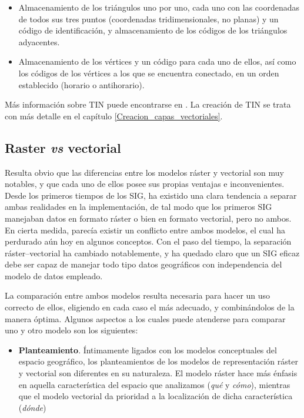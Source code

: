 \begin{multicols}{2}
\begin{itemize}
 \item Almacenamiento de los triángulos uno por uno, cada uno con las coordenadas de todos sus tres puntos (coordenadas tridimensionales, no planas) y un código de identificación, y almacenamiento de los códigos de los triángulos adyacentes.
\item Almacenamiento de los vértices y un código para cada uno de ellos, así como los códigos de los vértices a los que se encuentra conectado, en un orden establecido (horario o antihorario).
\end{itemize}

Más información sobre TIN puede encontrarse en \cite{Mark1975GA}. La creación de TIN se trata con más detalle en el capítulo \ref{Creacion_capas_vectoriales}.

\subsection{Raster \emph{vs} vectorial}

Resulta obvio que las diferencias entre los modelos ráster y vectorial son muy notables, y que cada uno de ellos posee sus propias ventajas e inconvenientes. Desde los primeros tiempos de los SIG, ha existido una clara tendencia a separar ambas realidades en la implementación, de tal modo que los primeros SIG manejaban datos en formato ráster o bien en formato vectorial, pero no ambos. En cierta medida, parecía existir un conflicto entre ambos modelos, el cual ha perdurado aún hoy en algunos conceptos. Con el paso del tiempo, la separación ráster--vectorial ha cambiado notablemente, y ha quedado claro que un SIG eficaz debe ser capaz de manejar todo tipo datos geográficos con independencia del modelo de datos empleado. 

La comparación entre ambos modelos resulta necesaria para hacer un uso correcto de ellos, eligiendo en cada caso el más adecuado, y combinándolos de la manera óptima. Algunos aspectos a los cuales puede atenderse para comparar uno y otro modelo son los siguientes:

\begin{itemize}
\item \textbf{Planteamiento}. Íntimamente ligados con los modelos conceptuales del espacio geográfico, los planteamientos de los modelos de representación ráster y vectorial son diferentes en su naturaleza. El modelo ráster hace más énfasis en aquella característica del espacio que analizamos (\emph{qué} y \emph{cómo}), mientras que el modelo vectorial da prioridad a la localización de dicha característica (\emph{dónde})


\end{itemize}
\end{multicols}
